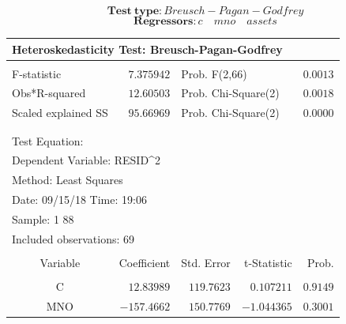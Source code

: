 \documentclass[12pt]{report}
\begin{document}
$$\textbf{Test}\ \textbf{type}: Breusch-Pagan-Godfrey$$ $$\textbf{Regressors}: c \quad mno \quad assets$$
\begin{table}[H]
	\centering
	\begin{tabular}{lrrrr}
		\multicolumn{5}{l}{Heteroskedasticity Test: Breusch-Pagan-Godfrey}\\
		[4.5pt] \hline \\ [-4.5pt]
		\multicolumn{1}{l}{F-statistic}&\multicolumn{1}{r}{$7.375942$}&\multicolumn{2}{l}{Prob. F(2,66)}&\multicolumn{1}{r}{$0.0013$}\\
		\multicolumn{1}{l}{Obs*R-squared}&\multicolumn{1}{r}{$12.60503$}&\multicolumn{2}{l}{Prob. Chi-Square(2)}&\multicolumn{1}{r}{$0.0018$}\\
		\multicolumn{1}{l}{Scaled explained SS}&\multicolumn{1}{r}{$95.66969$}&\multicolumn{2}{l}{Prob. Chi-Square(2)}&\multicolumn{1}{r}{$0.0000$}\\
		[4.5pt] \hline \\ [-4.5pt]
		\multicolumn{1}{c}{}&\multicolumn{1}{c}{}&\multicolumn{1}{c}{}&\multicolumn{1}{c}{}&\multicolumn{1}{c}{}\\
		\multicolumn{2}{l}{Test Equation:}&\multicolumn{1}{c}{}&\multicolumn{1}{c}{}&\multicolumn{1}{c}{}\\
		\multicolumn{3}{l}{Dependent Variable: RESID\textasciicircum 2}&\multicolumn{1}{c}{}&\multicolumn{1}{c}{}\\
		\multicolumn{3}{l}{Method: Least Squares}&\multicolumn{1}{c}{}&\multicolumn{1}{c}{}\\
		\multicolumn{3}{l}{Date: 09/15/18   Time: 19:06}&\multicolumn{1}{c}{}&\multicolumn{1}{c}{}\\
		\multicolumn{2}{l}{Sample: 1 88}&\multicolumn{1}{c}{}&\multicolumn{1}{c}{}&\multicolumn{1}{c}{}\\
		\multicolumn{3}{l}{Included observations: 69}&\multicolumn{1}{c}{}&\multicolumn{1}{c}{}\\
		[4.5pt] \hline \\ [-4.5pt]
		\multicolumn{1}{c}{Variable}&\multicolumn{1}{r}{Coefficient}&\multicolumn{1}{r}{Std. Error}&\multicolumn{1}{r}{t-Statistic}&\multicolumn{1}{r}{Prob.}\\
		[4.5pt] \hline \\ [-4.5pt]
		\multicolumn{1}{c}{C}&\multicolumn{1}{r}{$12.83989$}&\multicolumn{1}{r}{$119.7623$}&\multicolumn{1}{r}{$0.107211$}&\multicolumn{1}{r}{$0.9149$}\\
		\multicolumn{1}{c}{MNO}&\multicolumn{1}{r}{$-157.4662$}&\multicolumn{1}{r}{$150.7769$}&\multicolumn{1}{r}{$-1.044365$}&\multicolumn{1}{r}{$0.3001$}\\

\end{tabular}
\end{table}
\end{document}

